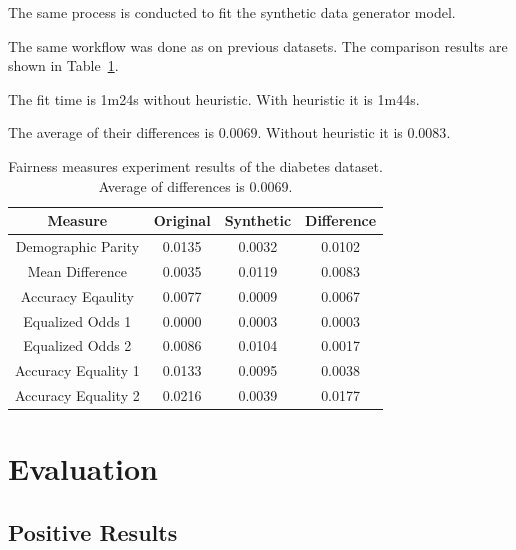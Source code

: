 \documentclass[manuscript,screen,review,anonymous]{acmart}
\begin{document}
The same process is conducted to fit the synthetic data generator model.

The same workflow was done as on previous datasets. The comparison results are shown in Table~\ref{tab:diabetes_score}.


The fit time is 1m24s without heuristic. With heuristic it is 1m44s.

The average of their differences is $0.0069$. Without heuristic it is $0.0083$.



\begin{table}[h]
\caption{Fairness measures experiment results of the diabetes dataset. Average of differences is 0.0069.}
\label{tab:diabetes_score}
\begin{tabular}{cccc}
\toprule
\textbf{Measure} & \textbf{Original} & \textbf{Synthetic} & \textbf{Difference} \\
\midrule
Demographic Parity  & 0.0135 & 0.0032 & 0.0102 \\
Mean Difference     & 0.0035 & 0.0119 & 0.0083 \\
Accuracy Eqaulity   & 0.0077 & 0.0009 & 0.0067 \\
Equalized Odds 1    & 0.0000 & 0.0003 & 0.0003 \\
Equalized Odds 2    & 0.0086 & 0.0104 & 0.0017 \\
Accuracy Equality 1 & 0.0133 & 0.0095 & 0.0038 \\
Accuracy Equality 2 & 0.0216 & 0.0039 & 0.0177 \\
\bottomrule
\end{tabular}
\end{table}

\section{Evaluation}


\subsection{Positive Results}
\end{document}
